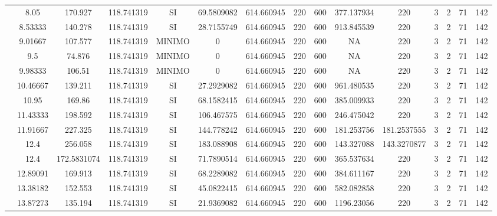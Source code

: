 \begin{table}[H]
{\begin{tabular}{|c|c|c|c|c|c|c|c|c|c|c|c|c|c|c|}
\cline{2-15}    & 8.05 & 170.927 & 118.741319 & SI  & 69.5809082 & 614.660945 & 220 & 600 & 377.137934 & 220 & 3   & 2   & 71  & 142 \bigstrut\\
\cline{2-15}    & 8.53333 & 140.278 & 118.741319 & SI  & 28.7155749 & 614.660945 & 220 & 600 & 913.845539 & 220 & 3   & 2   & 71  & 142 \bigstrut\\
\cline{2-15}    & 9.01667 & 107.577 & 118.741319 & MINIMO & 0   & 614.660945 & 220 & 600 & NA  & 220 & 3   & 2   & 71  & 142 \bigstrut\\
\cline{2-15}    & 9.5 & 74.876 & 118.741319 & MINIMO & 0   & 614.660945 & 220 & 600 & NA  & 220 & 3   & 2   & 71  & 142 \bigstrut\\
\cline{2-15}    & 9.98333 & 106.51 & 118.741319 & MINIMO & 0   & 614.660945 & 220 & 600 & NA  & 220 & 3   & 2   & 71  & 142 \bigstrut\\
\cline{2-15}    & 10.46667 & 139.211 & 118.741319 & SI  & 27.2929082 & 614.660945 & 220 & 600 & 961.480535 & 220 & 3   & 2   & 71  & 142 \bigstrut\\
\cline{2-15}    & 10.95 & 169.86 & 118.741319 & SI  & 68.1582415 & 614.660945 & 220 & 600 & 385.009933 & 220 & 3   & 2   & 71  & 142 \bigstrut\\
\cline{2-15}    & 11.43333 & 198.592 & 118.741319 & SI  & 106.467575 & 614.660945 & 220 & 600 & 246.475042 & 220 & 3   & 2   & 71  & 142 \bigstrut\\
\cline{2-15}    & 11.91667 & 227.325 & 118.741319 & SI  & 144.778242 & 614.660945 & 220 & 600 & 181.253756 & 181.2537555 & 3   & 2   & 71  & 142 \bigstrut\\
\cline{2-15}    & 12.4 & 256.058 & 118.741319 & SI  & 183.088908 & 614.660945 & 220 & 600 & 143.327088 & 143.3270877 & 3   & 2   & 71  & 142 \bigstrut\\
\cline{2-15}    & 12.4 & 172.5831074 & 118.741319 & SI  & 71.7890514 & 614.660945 & 220 & 600 & 365.537634 & 220 & 3   & 2   & 71  & 142 \bigstrut\\
\cline{2-15}    & 12.89091 & 169.913 & 118.741319 & SI  & 68.2289082 & 614.660945 & 220 & 600 & 384.611167 & 220 & 3   & 2   & 71  & 142 \bigstrut\\
\cline{2-15}    & 13.38182 & 152.553 & 118.741319 & SI  & 45.0822415 & 614.660945 & 220 & 600 & 582.082858 & 220 & 3   & 2   & 71  & 142 \bigstrut\\
\cline{2-15}    & 13.87273 & 135.194 & 118.741319 & SI  & 21.9369082 & 614.660945 & 220 & 600 & 1196.23056 & 220 & 3   & 2   & 71  & 142 \bigstrut\\

\end{tabular}}
\end{table}
